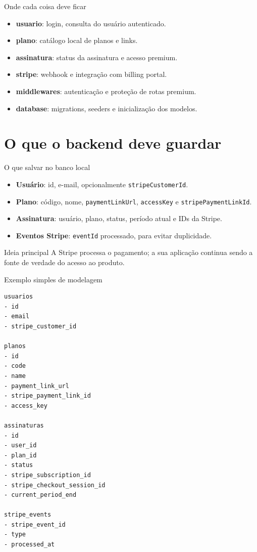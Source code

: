 \documentclass[aspectratio=169]{beamer}
\newcommand{\code}[1]{\texttt{#1}}
\begin{document}
\begin{frame}{Onde cada coisa deve ficar}
\begin{itemize}
  \item \textbf{usuario}: login, consulta do usuário autenticado.
  \item \textbf{plano}: catálogo local de planos e links.
  \item \textbf{assinatura}: status da assinatura e acesso premium.
  \item \textbf{stripe}: webhook e integração com billing portal.
  \item \textbf{middlewares}: autenticação e proteção de rotas premium.
  \item \textbf{database}: migrations, seeders e inicialização dos modelos.
\end{itemize}
\end{frame}

\section{O que o backend deve guardar}

\begin{frame}{O que salvar no banco local}
\begin{itemize}
  \item \textbf{Usuário}: id, e-mail, opcionalmente \code{stripeCustomerId}.
  \item \textbf{Plano}: código, nome, \code{paymentLinkUrl}, \code{accessKey} e \code{stripePaymentLinkId}.
  \item \textbf{Assinatura}: usuário, plano, status, período atual e IDs da Stripe.
  \item \textbf{Eventos Stripe}: \code{eventId} processado, para evitar duplicidade.
\end{itemize}

\begin{alertblock}{Ideia principal}
A Stripe processa o pagamento; a sua aplicação continua sendo a fonte de verdade do acesso ao produto.
\end{alertblock}
\end{frame}

\begin{frame}[fragile]{Exemplo simples de modelagem}
\begin{lstlisting}[language={}]
usuarios
- id
- email
- stripe_customer_id

planos
- id
- code
- name
- payment_link_url
- stripe_payment_link_id
- access_key

assinaturas
- id
- user_id
- plan_id
- status
- stripe_subscription_id
- stripe_checkout_session_id
- current_period_end

stripe_events
- stripe_event_id
- type
- processed_at
\end{lstlisting}
\end{frame}
\end{document}
